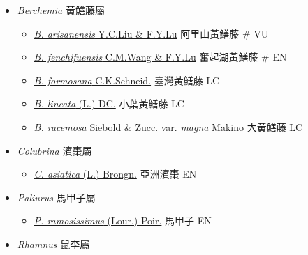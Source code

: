 
  \begin{itemize}
 \item[] \textit{Berchemia} 黃鱔藤屬
                                
  \begin{itemize}
        \item[] \href{http://www.theplantlist.org/tpl1.1/search?q=Berchemia+arisanensis}{\textit{B. arisanensis} Y.C.Liu \& F.Y.Lu}   阿里山黃鱔藤  \# VU
        \item[] \href{http://www.theplantlist.org/tpl1.1/search?q=Berchemia+fenchifuensis}{\textit{B. fenchifuensis} C.M.Wang \& F.Y.Lu}   奮起湖黃鱔藤  \# EN
        \item[] \href{http://www.theplantlist.org/tpl1.1/search?q=Berchemia+formosana}{\textit{B. formosana} C.K.Schneid.}   臺灣黃鱔藤   LC
        \item[] \href{http://www.theplantlist.org/tpl1.1/search?q=Berchemia+lineata}{\textit{B. lineata} (L.) DC.}   小葉黃鱔藤   LC
        \item[] \href{http://www.theplantlist.org/tpl1.1/search?q=Berchemia+racemosa+var.+magna}{\textit{B. racemosa} Siebold \& Zucc. var. \textit{magna} Makino}   大黃鱔藤   LC
  \end{itemize}
 \item[] \textit{Colubrina} 濱棗屬
                                
  \begin{itemize}
        \item[] \href{http://www.theplantlist.org/tpl1.1/search?q=Colubrina+asiatica}{\textit{C. asiatica} (L.) Brongn.}   亞洲濱棗   EN
  \end{itemize}
 \item[] \textit{Paliurus} 馬甲子屬
                                
  \begin{itemize}
        \item[] \href{http://www.theplantlist.org/tpl1.1/search?q=Paliurus+ramosissimus}{\textit{P. ramosissimus} (Lour.) Poir.}   馬甲子   EN
  \end{itemize}
 \item[] \textit{Rhamnus} 鼠李屬
                                

\end{itemize}
